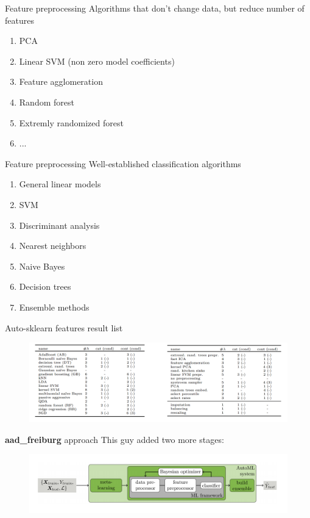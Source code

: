 \documentclass[12pt]{beamer}
\begin{document}
\begin{frame}{Feature preprocessing}
Algorithms that don't change data, but reduce number of features
\begin{enumerate}
    \item PCA
    \item Linear SVM (non zero model coefficients)
    \item Feature agglomeration
    \item Random forest
    \item Extremly randomized forest
    \item ...
\end{enumerate}
\end{frame}

\begin{frame}{Feature preprocessing}
Well-established classification algorithms
\begin{enumerate}
    \item General linear models
    \item SVM
    \item Discriminant analysis
    \item Nearest neighbors
    \item Naive Bayes
    \item Decision trees
    \item Ensemble methods
\end{enumerate}
\end{frame}

\begin{frame}{Auto-sklearn features result list}
\begin{figure}
\includegraphics[scale=0.3]{Auto_sklearn_features.png} 
\end{figure}
\end{frame}


\begin{frame}{\textbf{aad\_freiburg} approach}
This guy added two more stages:
\begin{figure}
\includegraphics[scale=0.35]{Auto_sklearn.png} 
\end{figure}
\end{frame}
\end{document}
